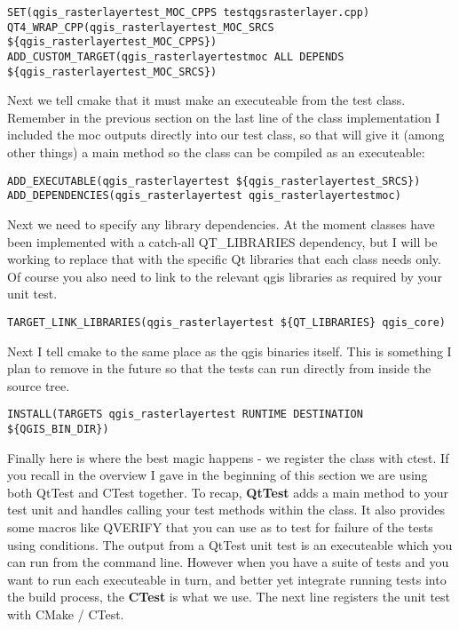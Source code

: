 \begin{verbatim}
SET(qgis_rasterlayertest_MOC_CPPS testqgsrasterlayer.cpp)
QT4_WRAP_CPP(qgis_rasterlayertest_MOC_SRCS ${qgis_rasterlayertest_MOC_CPPS})
ADD_CUSTOM_TARGET(qgis_rasterlayertestmoc ALL DEPENDS ${qgis_rasterlayertest_MOC_SRCS})
\end{verbatim}

Next we tell cmake that it must make an executeable from the test class.
Remember in the previous section on the last line of the class implementation I
included the moc outputs directly into our test class, so that will give it
(among other things) a main method so the class can be compiled as an
executeable:

\begin{verbatim}
ADD_EXECUTABLE(qgis_rasterlayertest ${qgis_rasterlayertest_SRCS})
ADD_DEPENDENCIES(qgis_rasterlayertest qgis_rasterlayertestmoc)
\end{verbatim}

Next we need to specify any library dependencies. At the moment classes have
been implemented with a catch-all QT\_LIBRARIES dependency, but I will be
working to replace that with the specific Qt libraries that each class needs
only. Of course you also need to link to the relevant qgis libraries as
required by your unit test.

\begin{verbatim}
TARGET_LINK_LIBRARIES(qgis_rasterlayertest ${QT_LIBRARIES} qgis_core)
\end{verbatim}

Next I tell cmake to the same place as the qgis binaries itself. This is
something I plan to remove in the future so that the tests can run directly
from inside the source tree.

\begin{verbatim}
INSTALL(TARGETS qgis_rasterlayertest RUNTIME DESTINATION ${QGIS_BIN_DIR})
\end{verbatim}

Finally here is where the best magic happens - we register the class with
ctest. If you recall in the overview I gave in the beginning of this section we
are using both QtTest and CTest together. To recap, \textbf{QtTest} adds a main
method to your test unit and handles calling your test methods within the
class. It also provides some macros like QVERIFY that you can use as to test
for failure of the tests using conditions. The output from a QtTest unit test
is an executeable which you can run from the command line.  However when you
have a suite of tests and you want to run each executeable in turn, and
better yet integrate running tests into the build process, the \textbf{CTest} is
what we use. The next line registers the unit test with CMake / CTest.

